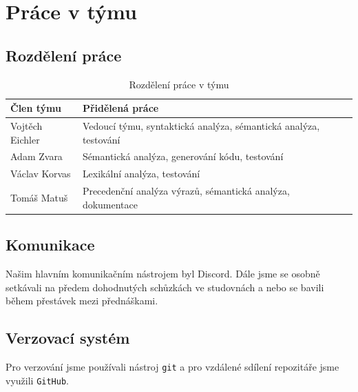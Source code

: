 \documentclass[11pt]{article}
\begin{document}
\section{Práce v týmu}

\subsection{Rozdělení práce}

\begin{table}[H]
    \centering
    \begin{tabular}{|l|l|}
        \hline
        \textbf{Člen týmu} & \textbf{Přidělená práce} \\\hline
        Vojtěch Eichler & Vedoucí týmu, syntaktická analýza, sémantická analýza, testování \\
        Adam Zvara & Sémantická analýza, generování kódu, testování \\
        Václav Korvas & Lexikální analýza, testování \\
        Tomáš Matuš & Precedenční analýza výrazů, sémantická analýza, dokumentace \\\hline
    \end{tabular}
    \label{tabulka_rozdeleni_prace}
    \caption{Rozdělení práce v týmu}
\end{table}

\subsection{Komunikace}
Našim hlavním komunikačním nástrojem byl Discord.
Dále jsme se osobně setkávali na předem dohodnutých schůzkách ve studovnách a nebo se bavili během přestávek mezi přednáškami.

\subsection{Verzovací systém}
Pro verzování jsme používali nástroj \texttt{git} a pro vzdálené sdílení repozitáře jsme využili \texttt{GitHub}.
\end{document}
